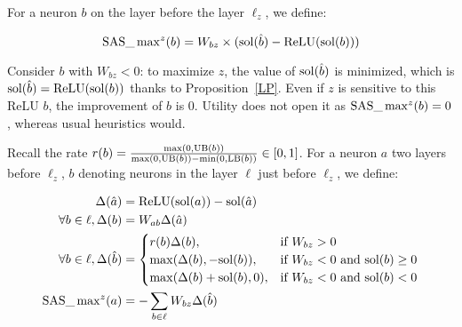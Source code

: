 \fi





For a neuron $b$ on the layer before the layer $\ell_z$, we define:


\vspace{-0.4cm}
	$$\mathrm{SAS}\_\max\nolimits^z(b) = W_{bz} \times (\mathrm{sol}(\hat{b})- \mathrm{ReLU}(\mathrm{sol}(b)))$$
\vspace{-0.4cm}
	

Consider $b$ with $W_{bz}<0$: to maximize $z$, the value of $\mathrm{sol}(\hat{b})$ is minimized, 
which is $\mathrm{sol}(\hat{b})=\mathrm{ReLU}(\mathrm{sol}(b))$ thanks to Proposition~\ref{LP}. 
Even if $z$ is sensitive to this ReLU $b$, the improvement of $b$ is 0.
Utility does not open it as $\mathrm{SAS}\_\max^z(b)=0$, whereas usual heuristics would.

Recall the rate $r(b)=\frac{\max(0,\mathrm{UB}(b))}{\max(0,\mathrm{UB}(b))-\min(0,\mathrm{LB}(b))} \in [0,1]$.
For a neuron $a$ two layers before $\ell_z$, 
$b$ denoting neurons in the layer $\ell$ just before $\ell_z$, 
we define:

\begin{align*}
	\Delta(\hat{a}) &= \ReLU(\sol(a))-\sol(\hat{a})\\
	\forall b \in \ell, \Delta(b) &= W_{ab}\Delta(\hat{a})\\
	\forall b \in \ell, \Delta(\hat{b}) &=
	\begin{cases}
		r(b)\Delta(b),%
		&\text{if }W_{bz} > 0 \\ %
		\max(\Delta(b),-\sol(b)),  &\text{if }  W_{bz} < 0 \text{ and } \sol(b)\geq0\\
		\max(\Delta(b)+\sol(b),0),  &\text{if }  W_{bz} < 0 \text{ and } \sol(b)<0		 
	\end{cases}\\
	\Utility\_\max\nolimits^z(a) &= -\sum_{b \in \ell} W_{bz} \Delta(\hat{b})
\end{align*}

